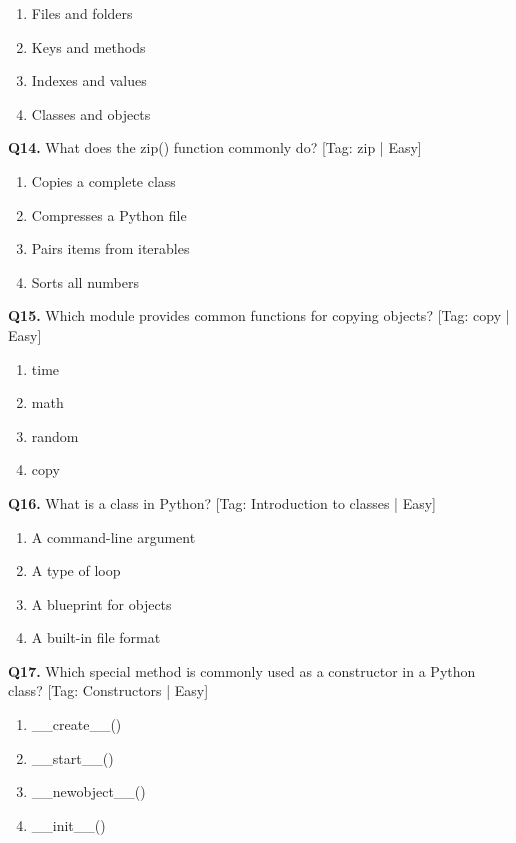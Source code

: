 \begin{enumerate}[label=(\alph*),topsep=2pt,itemsep=1pt,partopsep=0pt,parsep=0pt]
    \item {Files and folders}
    \item {Keys and methods}
    \item {Indexes and values}
    \item {Classes and objects}
\end{enumerate}
\vspace{2mm}
\noindent\textbf{Q14.} What does the zip() function commonly do? \hfill [Tag: zip | Easy]
\begin{enumerate}[label=(\alph*),topsep=2pt,itemsep=1pt,partopsep=0pt,parsep=0pt]
    \item {Copies a complete class}
    \item {Compresses a Python file}
    \item {Pairs items from iterables}
    \item {Sorts all numbers}
\end{enumerate}
\vspace{2mm}
\noindent\textbf{Q15.} Which module provides common functions for copying objects? \hfill [Tag: copy | Easy]
\begin{enumerate}[label=(\alph*),topsep=2pt,itemsep=1pt,partopsep=0pt,parsep=0pt]
    \item {time}
    \item {math}
    \item {random}
    \item {copy}
\end{enumerate}
\vspace{2mm}
\noindent\textbf{Q16.} What is a class in Python? \hfill [Tag: Introduction to classes | Easy]
\begin{enumerate}[label=(\alph*),topsep=2pt,itemsep=1pt,partopsep=0pt,parsep=0pt]
    \item {A command-line argument}
    \item {A type of loop}
    \item {A blueprint for objects}
    \item {A built-in file format}
\end{enumerate}
\vspace{2mm}
\noindent\textbf{Q17.} Which special method is commonly used as a constructor in a Python class? \hfill [Tag: Constructors | Easy]
\begin{enumerate}[label=(\alph*),topsep=2pt,itemsep=1pt,partopsep=0pt,parsep=0pt]
    \item {\_\_create\_\_()}
    \item {\_\_start\_\_()}
    \item {\_\_newobject\_\_()}
    \item {\_\_init\_\_()}
\end{enumerate}

